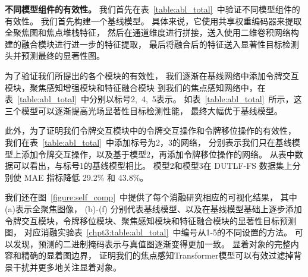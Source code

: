 
\textbf{不同模型组件的有效性。}
我们首先在表~\ref{table:abl_total}~中验证不同模型组件的有效性。
我们首先构建一个基线模型。 
具体来说，它使用共享权重编码器来提取全聚焦图和焦点堆栈特征，
然后在通道维度进行拼接，送入使用二维卷积网络构建的融合模块进行进一步的特征提取，
最后将融合后的特征送入显著性目标检测头并预测最终的显著性图。 




为了验证我们所提出的各个模块的有效性，
我们逐渐在基线网络中添加令牌交互模块，聚焦感知增强模块和特征融合模块
到我们的焦点感知网络中，在表~\ref{table:abl_total}~中分别以标号2,~4,~5表示。
如表~\ref{table:abl_total}~所示，这三个模型可以逐渐提高光场显著性目标检测性能，
最终大幅优于基线模型。 




此外，为了证明我们令牌交互模块中的令牌交互操作和令牌移位操作的有效性，
我们在表~\ref{table:abl_total}~中添加标号为2，3的网络，
分别表示我们只在基线模型上添加令牌交互操作，以及基于模型2，再添加令牌移位操作的网络。
从表中数据可以看出，与标号1的基线模型相比。
模型2和模型3在 DUTLF-FS 数据集上分别使 MAE 指标降低 29.2\% 和 43.8\%。 




我们还在图~\ref{figure:self_comp}~中提供了每个消融研究相应的可视化结果，
其中(a)表示全聚焦图像，
(b)-(f) 分别代表基线模型、以及在基线模型基础上逐步添加
令牌交互模块，令牌移位模块、聚焦感知模块和特征融合模块的显著性目标预测图，
对应消融实验表~\ref{chpt3:table:abl_total}~中编号从1-5的不同设置的方法。
可以发现，预测的二进制掩码表示与真值图逐渐变得更加一致。 
显着对象的完整内容和精确的显着图边界，
证明我们的焦点感知Transformer模型可以有效过滤掉背景干扰并更多地关注显着对象。 






